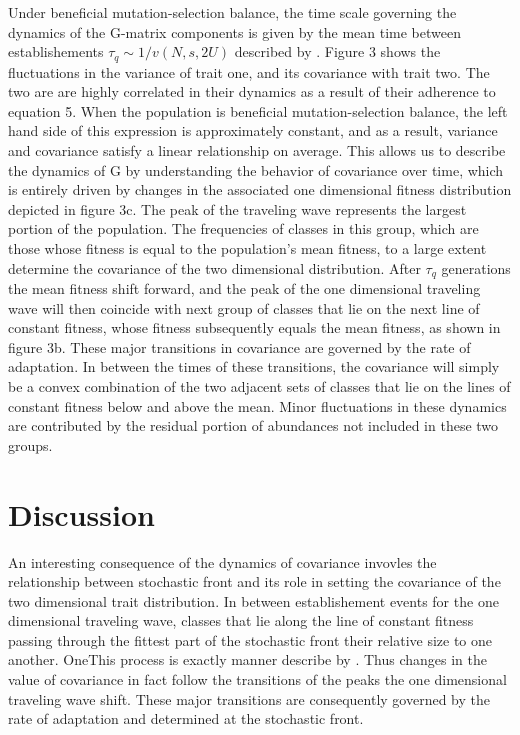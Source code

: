 \documentclass[11pt,twocolumn]{article}
\begin{document}

Under beneficial mutation-selection balance, the time scale governing the dynamics of the G-matrix components is given by the mean time between establishements $\tau_q \sim 1/v(N,s,2U)$ described by \cite{desai2007beneficial}. Figure 3 shows the fluctuations in the variance of trait one, and its covariance with trait two.  The two are are highly correlated in their dynamics as a result of their adherence to equation 5. When the population is beneficial mutation-selection balance, the left hand side of this expression is approximately constant, and as a result, variance and covariance satisfy a linear relationship on average. This allows us to describe the dynamics of G by understanding the behavior of covariance over time, which is entirely driven by changes in the associated one dimensional fitness distribution depicted in figure 3c. The peak of the traveling wave represents the largest portion of the population. The frequencies of classes in this group, which are those whose fitness is equal to the population's mean fitness, to a large extent determine the covariance of the two dimensional distribution. After $\tau_q$ generations the mean fitness shift forward, and the peak of the one dimensional traveling wave will then coincide with next group of classes that lie on the next line of constant fitness, whose fitness subsequently equals the mean fitness, as shown in figure 3b. These major transitions in covariance are governed by the rate of adaptation. In between the times of these transitions, the covariance will simply be a convex combination of the two adjacent sets of classes that lie on the lines of constant fitness below and above the mean. Minor fluctuations in these dynamics are contributed by the residual portion of abundances not included in these two groups.\par

\section{Discussion}

An interesting consequence of the dynamics of covariance invovles the relationship between stochastic front and its role in setting the covariance of the two dimensional trait distribution. In between establishement events for the one dimensional traveling wave, classes that lie along the line of constant fitness passing through the fittest part of the stochastic front their relative size to one another. OneThis process is exactly  manner describe by \cite{Desai2013}. Thus changes in the value of covariance in fact follow the transitions of the peaks the one dimensional traveling wave shift. These major transitions are consequently governed by the rate of adaptation and determined at the stochastic front.   
\end{document}
